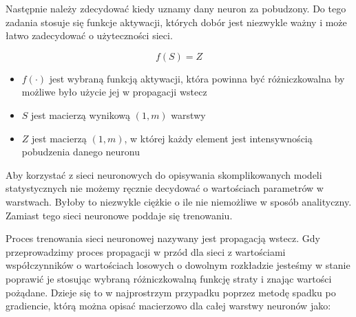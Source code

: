 \documentclass{article}
\begin{document}
Następnie należy zdecydować kiedy uznamy dany neuron za pobudzony. Do tego zadania 
stosuje się funkcje aktywacji, których dobór jest niezwykle ważny
i może łatwo zadecydować o użyteczności sieci.

\begin{equation}
    f(S) = Z
\end{equation}

\begin{itemize}
    \item $f(\cdot)$ jest wybraną funkcją aktywacji, która powinna być 
    różniczkowalna by możliwe było użycie jej w propagacji wstecz
    \item $S$ jest macierzą wynikową $(1, m)$ warstwy
    \item $Z$ jest macierzą $(1, m)$, w której każdy element jest intensywnością pobudzenia danego neuronu
\end{itemize}

Aby korzystać z sieci neuronowych do opisywania skomplikowanych modeli 
statystycznych nie możemy ręcznie decydować o wartościach parametrów w warstwach. 
Byłoby to niezwykle ciężkie o ile nie niemożliwe w sposób analityczny. 
Zamiast tego sieci neuronowe poddaje się trenowaniu.

Proces trenowania sieci neuronowej nazywany jest propagacją wstecz. Gdy 
przeprowadzimy proces propagacji w przód dla sieci z wartościami współczynników
o wartościach losowych o dowolnym rozkładzie jesteśmy w stanie poprawić 
je stosując wybraną różniczkowalną funkcję straty i znając wartości pożądane. Dzieje się to 
w najprostrzym przypadku poprzez metodę spadku po gradiencie, którą można 
opisać macierzowo dla całej warstwy neuronów jako:
\end{document}
